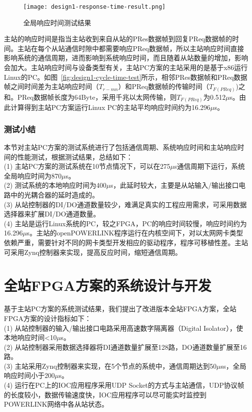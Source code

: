 \begin{figure}[!htb]
  \centering
  \texttt{[image: design1-response-time-result.png]}
  \caption{全局响应时间测试结果}
  \label{fig:design1-response-time-result}
\end{figure}

主站的响应时间是指当主站收到来自从站的PRes数据帧到回复PReq数据帧的时间。主站在每个从站通信时隙中都需要响应PReq数据帧，所以主站响应时间直接影响系统的通信周期，进而影响到系统响应时间，而且随着从站数量的增加，影响会加大。主站响应时间与设备类型有关，主站PC方案的主站采用的是基于x86运行Linux的PC。如图~\ref{fig:design1-cycle-time-test}所示，相邻PRes数据帧和PReq数据帧之间时间差为主站响应时间（$T_{r-mn}$）和PReq数据帧的传输时间（$T_{F(PReq)}$)之和。PReq数据帧长度为64Byte，采用千兆以太网传输，则$T_{F(PReq)}$为0.512$\mu$s。由此计算得到主站PC方案运行Linux PC的主站平均响应时间约为16.296$\mu$s。

\subsubsection{测试小结}
本节对主站PC方案的测试系统进行了包括通信周期、系统响应时间和主站响应时间的性能测试，根据测试结果，总结如下：\\
(1) 主站PC方案的测试系统在10节点情况下，可以在275$\mu$s通信周期下运行，系统全局响应时间为870$\mu$s。\\
(2) 测试系统的本地响应时间为400$\mu$s，此延时较大，主要是从站输入/输出接口电路中的光耦合器的延时造成的。\\
(3) 从站控制器的DI/DO通道数量较少，难满足真实的工程应用需求，可采用数据选择器来扩展DI/DO通道数量。\\
(4) 主站是运行Linux系统的PC，较之FPGA，PC的响应时间较慢，响应时间约为16.296$\mu$s。主站的openPOWERLINK程序运行在内核空间下，对以太网网卡类型依赖严重，需要针对不同的网卡类型开发相应的驱动程序，程序可移植性差。主站可采用Zynq控制器来实现，提高反应时间，缩短通信周期。

\section{全站FPGA方案的系统设计与开发}
\label{section:全站FPGA方案的系统设计与开发}

基于主站PC方案的系统测试结果，我们提出了改进版本全站FPGA方案，全站FPGA方案的设计指标如下：\\
(1) 从站控制器的输入/输出接口电路采用高速数字隔离器（Digital Isolator），使本地响应时间<10$\mu$s。\\
(2) 从站控制器采用数据选择器将DI通道数量扩展至128路，DO通道数量扩展至16路。\\
(3) 主站采用Zynq控制器来实现，在5个节点的系统中，通信周期达到50$\mu$ss，全局响应时间小于200$\mu$s。\\
(4) 运行在PC上的IOC应用程序采用UDP Socket的方式与主站通信，UDP协议帧的长度较小，数据传输速度快，IOC应用程序可以尽可能实时监控到POWERLINK网络中各从站状态。

